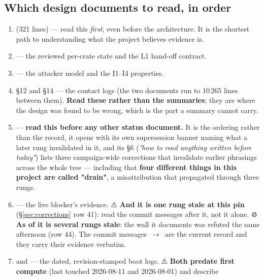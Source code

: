 \documentclass[10.5pt]{article}
\begin{document}
\subsection{Which design documents to read, in order}
\label{sec:reading}

\begin{enumerate}
\item {} (321 lines) — read this \emph{first}, even before
  the architecture. It is the shortest path to understanding what the project believes evidence is.
\item {} — the reviewed per-crate state and the
  L1 hand-off contract.
\item {} — the attacker model and the I1--I4
  properties.
\item {} \S12 and  \S14 —
  the contact logs (the two documents run to 10\,265 lines between them). \textbf{Read these rather than the summaries};
  they are where the design was found to be wrong, which is the part a summary cannot carry.
\item {} — \textbf{read this before any other
  status document.} It is the ordering rather than the record, it opens with its own supersession
  banner naming what a later rung invalidated in it, and its \S6 (\emph{"how to read anything
  written before today"}) lists three campaign-wide corrections that invalidate earlier phrasings
  across the whole tree — including that \textbf{four different things in this project are called
  "drain"}, a misattribution that propagated through three rungs.
\item {} — the live blocker's evidence.
  ⚠ \textbf{And it is one rung stale at this pin} (\S\ref{sec:corrections} row 41): read the
  commit messages after it, not it alone. ⊘ \textbf{As of  it is several rungs
  stale}: the wall it documents was refuted the same afternoon (row 44). The commit messages
  \,$\to$\, are the current record and they carry their evidence
  verbatim.
\item {} and
   — the dated, revision-stamped boot logs.
  ⚠ \textbf{Both predate first compute} (last touched 2026-08-11 and 2026-08-01) and describe

\end{enumerate}
\end{document}
